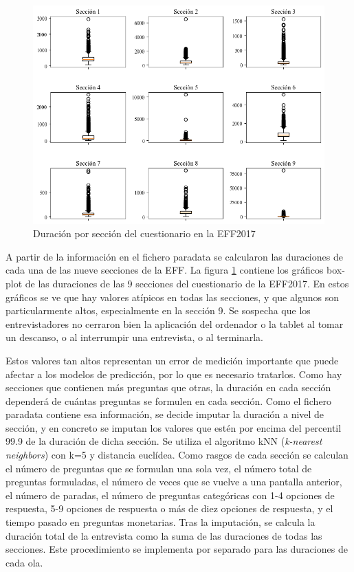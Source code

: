 \begin{figure}[ht]
	\centering
	\includegraphics[width=1\textwidth]{figs/figure4.png}
	\caption{Duración por sección del cuestionario en la EFF2017}
	\label{fig:fig4}
\end{figure}

A partir de la información en el fichero paradata se calcularon las duraciones de cada una de las nueve secciones de la EFF. La figura \ref{fig:fig4} contiene los gráficos box-plot de las duraciones de las 9 secciones del cuestionario de la EFF2017. En estos gráficos se ve que hay valores atípicos en todas las secciones, y que algunos son particularmente altos, especialmente en la sección 9. Se sospecha que los entrevistadores no cerraron bien la aplicación del ordenador o la tablet al tomar un descanso, o al interrumpir una entrevista, o al terminarla.

Estos valores tan altos representan un error de medición importante que puede afectar a los modelos de predicción, por lo que es necesario tratarlos. Como hay secciones que contienen más preguntas que otras, la duración en cada sección dependerá de cuántas preguntas se formulen en cada sección. Como el fichero paradata contiene esa información, se decide imputar la duración a nivel de sección, y en concreto se imputan los valores que estén por encima del percentil 99.9 de la duración de dicha sección. Se utiliza el algoritmo kNN (\textit{k-nearest neighbors}) con k=5 y distancia euclídea. Como rasgos de cada sección se calculan el número de preguntas que se formulan una sola vez, el número total de preguntas formuladas, el número de veces que se vuelve a una pantalla anterior, el número de paradas, el número de preguntas categóricas con 1-4 opciones de respuesta, 5-9 opciones de respuesta o más de diez opciones de respuesta, y el tiempo pasado en preguntas monetarias. Tras la imputación, se calcula la duración total de la entrevista como la suma de las duraciones de todas las secciones. Este procedimiento se implementa por separado para las duraciones de cada ola.

